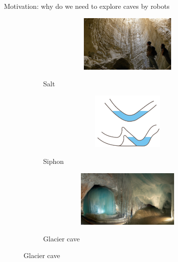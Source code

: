 \documentclass[aspectratio=169,xcolor=table]{beamer}
\begin{document}
\begin{frame}[t]{Motivation: why do we need to explore caves by robots}
    \vspace{-0.85cm}
    \begin{figure}[H]
        \begin{subfigure}[b]{0.3\textwidth}
            \centering\includegraphics[height=2.8cm,width=1\textwidth,keepaspectratio]{surface_types/salt.jpg}\\
            \caption*{Salt}
            \label{fig:surface_types/salt}
        \end{subfigure}
        \hfill
        \begin{subfigure}[b]{0.3\textwidth}
            \centering\includegraphics[height=2.8cm,width=1\textwidth,keepaspectratio]{surface_types/siphon.png}\\
            \caption*{Siphon}
            \label{fig:surface_types/siphon}
        \end{subfigure}
        \hfill
        \begin{subfigure}[b]{0.3\textwidth}
            \centering\includegraphics[height=2.8cm,width=1\textwidth,keepaspectratio]{surface_types/ice.png}\\
            \caption*{Glacier cave}
            \label{fig:surface_types/ice}
        \end{subfigure}


\end{figure}
\end{frame}
\end{document}
